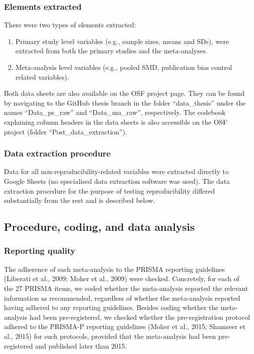 \documentclass[
  man,floatsintext]{apa6}
\providecommand{\tightlist}{%
  \setlength{\itemsep}{0pt}\setlength{\parskip}{0pt}}
\begin{document}
\hypertarget{elements-extracted}{%
\subsubsection{Elements extracted}\label{elements-extracted}}

There were two types of elements extracted:

\begin{enumerate}
\def\labelenumi{\arabic{enumi}.}
\tightlist
\item
  Primary study level variables (e.g., sample sizes, means and SDs), were extracted from both the primary studies and the meta-analyses.
\item
  Meta-analysis level variables (e.g., pooled SMD, publication bias control related variables).
\end{enumerate}

Both data sheets are also available on the OSF project page. They can be found by navigating to the GitHub thesis branch in the folder ``data\_thesis'' under the names ``Data\_ps\_raw'' and ``Data\_ma\_raw'', respectively. The codebook explaining column headers in the data sheets is also accessible on the OSF project (folder ``Post\_data\_extraction'').

\hypertarget{data-extraction-procedure}{%
\subsubsection{Data extraction procedure}\label{data-extraction-procedure}}

Data for all non-reproducibility-related variables were extracted directly to Google Sheets (no specialised data extraction software was used). The data extraction procedure for the purpose of testing reproducibility differed substantially from the rest and is described below.

\hypertarget{procedure-coding-and-data-analysis}{%
\subsection{Procedure, coding, and data analysis}\label{procedure-coding-and-data-analysis}}

\hypertarget{reporting-quality-1}{%
\subsubsection{Reporting quality}\label{reporting-quality-1}}

The adherence of each meta-analysis to the PRISMA reporting guidelines (Liberati et al., 2009; Moher et al., 2009) were checked. Concretely, for each of the 27 PRISMA items, we coded whether the meta-analysis reported the relevant information as recommended, regardless of whether the meta-analysis reported having adhered to any reporting guidelines. Besides coding whether the meta-analysis had been pre-registered, we checked whether the pre-registration protocol adhered to the PRISMA-P reporting guidelines (Moher et al., 2015; Shamseer et al., 2015) for such protocols, provided that the meta-analysis had been pre-registered and published later than 2015.
\end{document}
